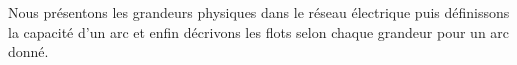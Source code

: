 Nous pr\'esentons les grandeurs physiques dans le r\'eseau \'electrique puis d\'efinissons la capacit\'e d'un arc et enfin d\'ecrivons les flots selon chaque grandeur pour un arc donn\'e.
